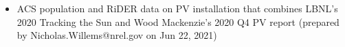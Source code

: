 \begin{itemize}
\item ACS population and RiDER data on PV installation that combines LBNL's 2020 Tracking the Sun and Wood Mackenzie's 2020 Q4 PV report (prepared by Nicholas.Willems@nrel.gov on Jun 22, 2021)
\end{itemize}

